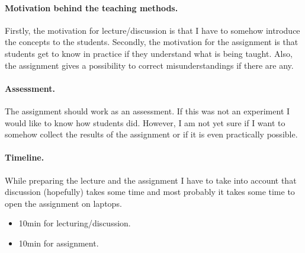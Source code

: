 \documentclass[a4paper,12pt]{article}
\begin{document}
\paragraph{Motivation behind the teaching methods.} Firstly, the motivation for
lecture/discussion is that I have to somehow introduce the concepts to the
students. Secondly, the motivation for the assignment is that students get to
know in practice if they understand what is being taught. Also, the assignment
gives a possibility to correct misunderstandings if there are any.

\paragraph{Assessment.} The assignment should work as an assessment. If this was
not an experiment I would like to know how students did. However, I am not
yet sure if I want to somehow collect the results of the assignment or if it is
even practically possible.

\paragraph{Timeline.} While preparing the lecture and the assignment I have to
take into account that discussion (hopefully) takes some time and most probably
it takes some time to open the assignment on laptops.
\begin{itemize}
    \item 10min for lecturing/discussion.
    \item 10min for assignment.
\end{itemize}
\end{document}
